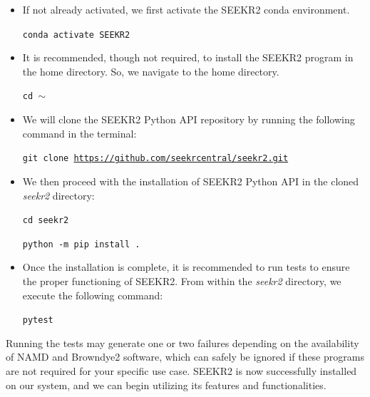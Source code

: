 \documentclass[9pt,training,pubversion]{livecoms}
\newcommand{\seekrgithublink}{\url{https://github.com/seekrcentral/seekr2.git}}
\begin{document}
\noindent
\begin{itemize}

\item If not already activated, we first activate the SEEKR2 conda environment. 

\begin{tcolorbox}[colback=black!8!white, colframe=black!50!black, fontlower=\tiny, left=2pt, right=2pt, top=2pt, bottom=2pt] 
\texttt{conda activate SEEKR2}
\end{tcolorbox}

\item It is recommended, though not required, to install the SEEKR2 program in the home directory. So, we navigate to the home directory. 

\begin{tcolorbox}[colback=black!8!white, colframe=black!50!black, fontlower=\tiny, left=2pt, right=2pt, top=2pt, bottom=2pt] 
\texttt{cd $\sim$}
\end{tcolorbox}

\item We will clone the SEEKR2 Python API repository by running the following command in the terminal:

\begin{tcolorbox}[colback=black!8!white, colframe=black!50!black, fontlower=\tiny, left=2pt, right=2pt, top=2pt, bottom=2pt] 
\texttt{git clone \seekrgithublink}
\end{tcolorbox}

\item We then proceed with the installation of SEEKR2 Python API in the cloned \textit{seekr2} directory:

\begin{tcolorbox}[colback=black!8!white, colframe=black!50!black, fontlower=\tiny, left=2pt, right=2pt, top=2pt, bottom=2pt] 
\texttt{cd seekr2} 
\end{tcolorbox}

\begin{tcolorbox}[colback=black!8!white, colframe=black!50!black, fontlower=\tiny, left=2pt, right=2pt, top=2pt, bottom=2pt] 
\texttt{python -m pip install .}
\end{tcolorbox}

\item Once the installation is complete, it is recommended to run tests to ensure the proper functioning of SEEKR2. From within the \textit{seekr2} directory, we execute the following command:

\begin{tcolorbox}[colback=black!8!white, colframe=black!50!black, fontlower=\tiny, left=2pt, right=2pt, top=2pt, bottom=2pt] 
\texttt{pytest}
\end{tcolorbox}

\end{itemize}
\noindent Running the tests may generate one or two failures depending on the availability of NAMD and Browndye2 software, which can safely be ignored if these programs are not required for your specific use case. SEEKR2 is now successfully installed on our system, and we can begin utilizing its features and functionalities.
\end{document}
